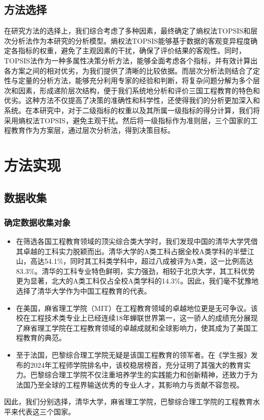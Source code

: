 \documentclass{mcmthesis}
\begin{document}
\subsection{方法选择}
在研究方法的选择上，我们综合考虑了多种因素，最终确定了熵权法TOPSIS和层次分析法作为本研究的分析模型。熵权法TOPSIS能够基于数据的客观变异程度确定各指标的权重，避免了主观因素的干扰，确保了评价结果的客观性。同时，TOPSIS法作为一种多属性决策分析方法，能够全面考虑各个指标，并有效计算出各方案之间的相对优劣，为我们提供了清晰的比较依据。而层次分析法则结合了定性与定量的分析方法，能够充分利用专家的经验和判断，将复杂问题分解为多个层次和因素，形成递阶层次结构，便于我们系统地分析和评价三国工程教育的特色和优劣。这种方法不仅提高了决策的准确性和科学性，还使得我们的分析更加深入和系统。在本研究中，对于二级指标的权重以及其所属一级指标的得分计算，我们将采用熵权法TOPSIS，避免主观干扰。然后将一级指标作为准则层，三个国家的工程教育作为方案层，通过层次分析法，得到决策目标。
\section{方法实现}
\subsection{数据收集}
\subsubsection{确定数据收集对象}
\begin{itemize}
	\item 在筛选各国工程教育领域的顶尖综合类大学时，我们发现中国的清华大学凭借其卓越的工科实力脱颖而出。清华大学的A类工科占据全校A类学科的半壁江山，高达54.1\%，同时其工科类学科中，超过八成被评为A类，这一比例高达83.3\%。清华的工科专业特色鲜明，实力强劲，相较于北京大学，其工科优势更为显著，北大的A类工科仅占全校A类学科的14.3\%\cite{2}。因此，我们毫不犹豫地选择了清华大学作为中国工程教育的代表。
	\item 在美国，麻省理工学院（MIT）在工程教育领域的卓越地位更是无可争议。该校在工程技术类专业上已经连续18年蝉联世界第一，这一骄人的成绩充分展现了麻省理工学院在工程教育领域的卓越成就和全球影响力，使其成为了美国工程教育的典范。
	\item 至于法国，巴黎综合理工学院无疑是该国工程教育的领军者。在《学生报》发布的2024年工程师学院排名中，该校稳居榜首，充分证明了其强大的教育实力。巴黎综合理工学院不仅注重培养学生的实践能力和创新精神，还致力于为法国乃至全球的工程界输送优秀的专业人才，其影响力与贡献不容忽视。
\end{itemize}
\par
因此，我们分别选择，清华大学，麻省理工学院，巴黎综合理工学院的工程教育水平来代表这三个国家。
\end{document}
